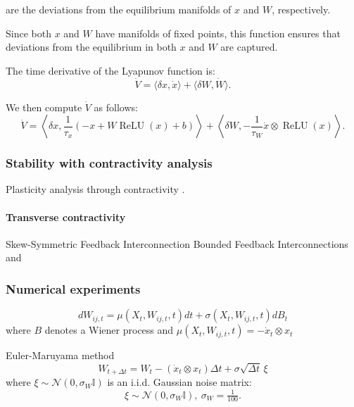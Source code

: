 \documentclass{article}
\theoremstyle{definition} \newtheorem{definition}{Definition}
\theoremstyle{remark} \newtheorem{remark}{Remark}
\newcounter{ct}
\begin{document}
are the deviations from the equilibrium manifolds of \(x\) and \(W\), respectively.

Since both \(x\) and \(W\) have manifolds of fixed points, this function ensures that deviations from the equilibrium in both \(x\) and \(W\) are captured.

The time derivative of the Lyapunov function is:
\[
\dot{V} = \langle \delta x, \dot{x} \rangle + \langle \delta W, \dot{W} \rangle.
\]

We then compute \(\dot{V}\) as follows:
\[
\dot{V} = \left\langle \delta x, \frac{1}{\tau_x} \left( -x + W \operatorname{ReLU}(x) + b \right) \right\rangle 
+ \left\langle \delta W, -\frac{1}{\tau_W} \dot{x} \otimes \operatorname{ReLU}(x) \right\rangle.
\]

\subsubsection{Stability with contractivity analysis}

Plasticity analysis through contractivity \citep{kozachkov2022matrix} \citep{centorrino2024modeling}.

\paragraph{Transverse contractivity}
Skew-Symmetric Feedback Interconnection \citep{manchester2014transverse}
Bounded Feedback Interconnections \citep{wang2005contraction} and \citep{manchester2014transverse}





\subsubsection{Numerical experiments}
\begin{equation}
dW_{ij,t} = \mu(X_t, W_{ij,t}, t)dt + \sigma(X_t, W_{ij,t}, t)dB_t
\end{equation}
 where $B$ denotes a Wiener process and $ \mu(X_t, W_{ij,t}, t) = -\dot x_t \otimes x_t$

Euler-Maruyama method
\[
W_{t+\Delta t} = W_t -( \dot x_t \otimes x_t) \Delta t + \sigma \sqrt{\Delta t} \, \xi
\]
where \(\xi \sim \mathcal{N}(0, \sigma_W\mathbb{I})\) is an i.i.d. Gaussian noise matrix:
\begin{equation}
\xi \sim \mathcal{N}(0,\sigma_W\mathbb{I}), \ \sigma_W=\tfrac{1}{100}.
\end{equation}
\end{document}
